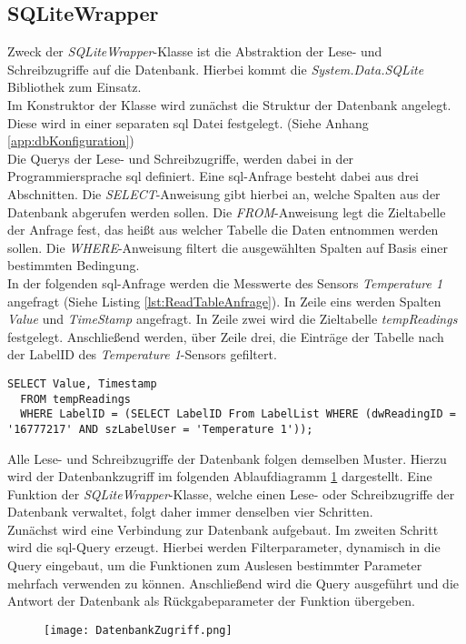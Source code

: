 \subsection*{SQLiteWrapper}
Zweck der \textit{SQLiteWrapper}-Klasse ist die Abstraktion der Lese- und Schreibzugriffe auf die Datenbank.  Hierbei kommt die \textit{System.Data.SQLite} Bibliothek zum Einsatz. \\
Im Konstruktor der Klasse wird zunächst die Struktur der Datenbank angelegt. Diese wird in einer separaten \ac{sql} Datei festgelegt. (Siehe Anhang \ref{app:dbKonfiguration})\\
Die Querys der Lese- und Schreibzugriffe, werden dabei in der Programmiersprache \ac{sql} definiert. Eine \ac{sql}-Anfrage besteht dabei aus drei Abschnitten. Die \textit{SELECT}-Anweisung gibt hierbei an, welche Spalten aus der Datenbank abgerufen werden sollen. Die \textit{FROM}-Anweisung legt die Zieltabelle der Anfrage fest, das heißt aus welcher Tabelle die Daten entnommen werden sollen. Die \textit{WHERE}-Anweisung filtert die ausgewählten Spalten auf Basis einer bestimmten Bedingung.\\
In der folgenden \ac{sql}-Anfrage werden die Messwerte des Sensors \textit{Temperature 1} angefragt (Siehe Listing \ref{lst:ReadTableAnfrage}). In Zeile eins werden Spalten \textit{Value} und \textit{TimeStamp} angefragt. In Zeile zwei wird die Zieltabelle \textit{tempReadings} festgelegt. Anschließend werden, über Zeile drei, die Einträge der Tabelle nach der LabelID des \textit{Temperature 1}-Sensors gefiltert.  
\begin{lstlisting}[caption={Query Anfrage zum Auslesen eines bestimmten Sensorwertes}, label={lst:ReadTableAnfrage}]
  SELECT Value, Timestamp 
  FROM tempReadings 
  WHERE LabelID = (SELECT LabelID From LabelList WHERE (dwReadingID = '16777217' AND szLabelUser = 'Temperature 1'));
\end{lstlisting}

Alle Lese- und Schreibzugriffe der Datenbank folgen demselben Muster. Hierzu wird der Datenbankzugriff im folgenden Ablaufdiagramm \ref{fig:Datenbankzugriff} dargestellt. Eine Funktion der \textit{SQLiteWrapper}-Klasse, welche einen Lese- oder Schreibzugriffe der Datenbank verwaltet, folgt daher immer denselben vier Schritten.\\
Zunächst wird eine Verbindung zur Datenbank aufgebaut. Im zweiten Schritt wird die \ac{sql}-Query erzeugt. Hierbei werden Filterparameter, dynamisch in die Query eingebaut, um die Funktionen zum Auslesen bestimmter Parameter mehrfach verwenden zu können. Anschließend wird die Query ausgeführt und die Antwort der Datenbank als Rückgabeparameter der Funktion übergeben.   
\begin{center}
  \begin{figure}[h!]
      \centering
      \texttt{[image: DatenbankZugriff.png]}
      \caption{}
      \label{fig:Datenbankzugriff}
  \end{figure}
\end{center}
